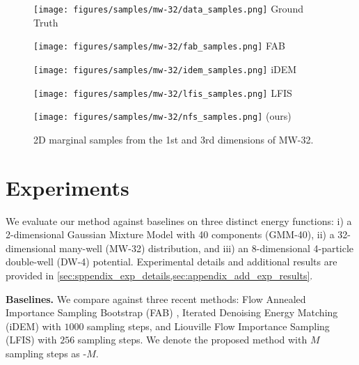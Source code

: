 \begin{figure}[!t]
    \vspace{-4mm}
    \centering
    \begin{minipage}[t]{0.195\linewidth}
        \centering
        \texttt{[image: figures/samples/mw-32/data\_samples.png]}
        Ground Truth
    \end{minipage}
    \begin{minipage}[t]{0.195\linewidth}
        \centering
        \texttt{[image: figures/samples/mw-32/fab\_samples.png]}
        FAB
    \end{minipage}
    \begin{minipage}[t]{0.195\linewidth}
        \centering
        \texttt{[image: figures/samples/mw-32/idem\_samples.png]}
        iDEM
    \end{minipage}
    \begin{minipage}[t]{0.195\linewidth}
        \centering
        \texttt{[image: figures/samples/mw-32/lfis\_samples.png]}
        LFIS
    \end{minipage}
    \begin{minipage}[t]{0.195\linewidth}
        \centering
        \texttt{[image: figures/samples/mw-32/nfs\_samples.png]}
        \ours (ours)
    \end{minipage}
    \vspace{-2mm}
    \caption{2D marginal samples from the 1st and 3rd dimensions of MW-32.}
    \vspace{-4mm}
    \label{fig:mw32-visualised}
\end{figure}

\section{Experiments}
We evaluate our method against baselines on three distinct energy functions: i) a 2-dimensional Gaussian Mixture Model with 40 components (GMM-40), ii) a 32-dimensional many-well (MW-32) distribution, and iii) an 8-dimensional 4-particle double-well (DW-4) potential. Experimental details and additional results are provided in \cref{sec:sppendix_exp_details,sec:appendix_add_exp_results}.

\textbf{Baselines.} We compare against three recent methods: Flow Annealed Importance Sampling Bootstrap (FAB) \citep{midgley2022flow}, Iterated Denoising Energy Matching (iDEM) \citep{AkhoundSadegh2024IteratedDE} with $1000$ sampling steps, and Liouville Flow Importance Sampling (LFIS) \citep{tian2024liouville} with $256$ sampling steps.
We denote the proposed method with $M$ sampling steps as \ours-$M$.

